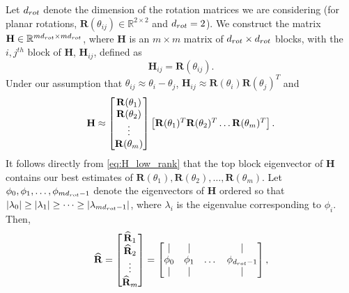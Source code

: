 Let $d_{rot}$ denote the dimension of the rotation matrices we are considering (for planar rotations, $\mathbf{R}(\theta_{ij}) \in \mathbb{R}^{2 \times 2}$ and $d_{rot}=2$).
%
We construct the matrix $\mathbf{H} \in \mathbb{R}^{m d_{rot} \times m d_{rot}}$, where $\mathbf{H}$ is an $m \times m$ matrix of $d_{rot} \times d_{rot}$ blocks, with the $i,j^{th}$ block of $\mathbf{H}$, $\mathbf{H}_{ij}$, defined as
\begin{equation} \label{eq:H_to_R}
\mathbf{H}_{ij} = \mathbf{R}(\theta_{ij}).
\end{equation}
%
%
Under our assumption that $\theta_{ij} \approx \theta_i - \theta_j$, $\mathbf{H}_{ij} \approx \mathbf{R}(\theta_i) \mathbf{R}(\theta_j)^T$
 and
\begin{equation} \label{eq:H_low_rank}
	\mathbf{H} \approx
	\begin{bmatrix}
	\mathbf{R}(\theta_1) \\
	\mathbf{R}(\theta_2) \\
	\vdots \\
	\mathbf{R}(\theta_m)
	\end{bmatrix}
	\begin{bmatrix}
	\mathbf{R}(\theta_1)^T \mathbf{R}(\theta_2)^T \dots \mathbf{R}(\theta_m)^T
	\end{bmatrix}.
\end{equation}
%
It follows directly from \eqref{eq:H_low_rank} that the top block eigenvector of $\mathbf{H}$ contains our best estimates of $\mathbf{R}(\theta_1), \mathbf{R}(\theta_2), \dots, \mathbf{R}(\theta_m)$.
%
Let $\phi_0, \phi_1, \dots, \phi_{m d_{rot}-1}$ denote the eigenvectors of $\mathbf{H}$ ordered so that $|\lambda_0| \ge |\lambda_1| \ge \dots \ge |\lambda_{m d_{rot} -1}|$, where $\lambda_i$ is the eigenvalue corresponding to $\phi_i$.
%
Then,
\begin{equation} \label{eq:R_hat}
\widehat{\mathbf{R}} =
\begin{bmatrix}
\widehat{\mathbf{R}}_1 \\
\widehat{\mathbf{R}}_2 \\
\vdots \\
\widehat{\mathbf{R}}_m
\end{bmatrix} =
\begin{bmatrix}
| & | & & | \\
\phi_0 & \phi_1 & \dots & \phi_{d_{rot}-1} \\
| & | & & |
\end{bmatrix},
\end{equation}
